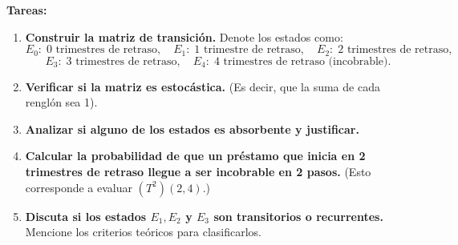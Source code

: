 \documentclass{article}
\begin{document}
\begin{problem}
\textbf{Tareas:}
\begin{enumerate}
    \item \textbf{Construir la matriz de transición.} Denote los estados como:
    \[
    E_0:\; 0 \text{ trimestres de retraso}, \quad 
    E_1:\; 1 \text{ trimestre de retraso}, \quad
    E_2:\; 2 \text{ trimestres de retraso}, \] 
    \[E_3:\; 3 \text{ trimestres de retraso}, \quad
    E_4:\; 4 \text{ trimestres de retraso (incobrable)}.
    \]
    \item \textbf{Verificar si la matriz es estocástica.} (Es decir, que la suma de cada renglón sea 1).
    \item \textbf{Analizar si alguno de los estados es absorbente y justificar.}  
    \item \textbf{Calcular la probabilidad de que un préstamo que inicia en 2 trimestres de retraso llegue a ser incobrable en 2 pasos.} (Esto corresponde a evaluar \((T^2)(2,4)\).)
    \item \textbf{Discuta si los estados \(E_1, E_2\) y \(E_3\) son transitorios o recurrentes.} Mencione los criterios teóricos para clasificarlos.
\end{enumerate}
\end{problem}
\end{document}
